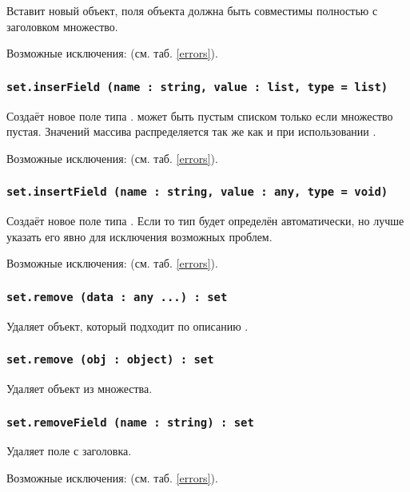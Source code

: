 Вставит новый объект, поля объекта  должна быть совместимы полностью с заголовком множество.

Возможные исключения:  (см. таб. \ref{errors}).

\subsubsection{\lstinline|set.inserField (name : string, value : list, type = list)|}

Создаёт новое поле типа .  может быть пустым списком только если множество пустая. Значений массива распределяется так же как и при использовании .

Возможные исключения:  (см. таб. \ref{errors}).

\subsubsection{\lstinline|set.insertField (name : string, value : any, type = void)|}

Создаёт новое поле типа . Если  то тип будет определён автоматически, но лучше указать его явно для исключения возможных проблем.

Возможные исключения:  (см. таб. \ref{errors}).

\subsubsection{\lstinline|set.remove (data : any ...) : set|}

Удаляет объект, который подходит по описанию .

\subsubsection{\lstinline|set.remove (obj : object) : set|}

Удаляет объект  из множества.

\subsubsection{\lstinline|set.removeField (name : string) : set|}

Удаляет поле  с заголовка.

Возможные исключения:  (см. таб. \ref{errors}).

